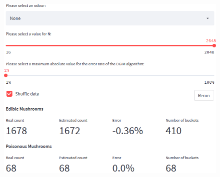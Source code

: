 \begin{frame}{}
	\begin{figure}
		\includegraphics[height=.75\linewidth]{images/small_e.png}
	\end{figure}
\end{frame}